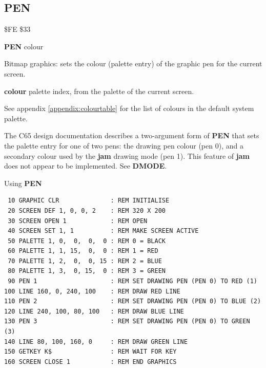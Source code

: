 \subsection{PEN}
\begin{description}[leftmargin=2cm,style=nextline]
\item [Token:]    \$FE \$33

\item [Format:]   {\bf PEN} colour

\item [Usage:]    Bitmap graphics: sets the colour (palette entry) of the graphic pen for the current screen.

                  {\bf colour} palette index, from the palette of the current screen.

                  See appendix \vref{appendix:colourtable} for the list of colours in the default system palette.

\item [Remarks:]  The C65 design documentation describes a two-argument form of {\bf PEN} that sets the palette entry for one of two pens: the drawing pen colour (pen 0), and a secondary colour used by the {\bf jam} drawing mode (pen 1). This feature of {\bf jam} does not appear to be implemented. See {\bf DMODE}.

\item [Example:]  Using {\bf PEN}

\begin{tcolorbox}[colback=black,coltext=white]
\verbatimfont{\codefont}
\begin{verbatim}
 10 GRAPHIC CLR              : REM INITIALISE
 20 SCREEN DEF 1, 0, 0, 2    : REM 320 X 200
 30 SCREEN OPEN 1            : REM OPEN
 40 SCREEN SET 1, 1          : REM MAKE SCREEN ACTIVE
 50 PALETTE 1, 0,  0,  0,  0 : REM 0 = BLACK
 60 PALETTE 1, 1, 15,  0,  0 : REM 1 = RED
 70 PALETTE 1, 2,  0,  0, 15 : REM 2 = BLUE
 80 PALETTE 1, 3,  0, 15,  0 : REM 3 = GREEN
 90 PEN 1                    : REM SET DRAWING PEN (PEN 0) TO RED (1)
100 LINE 160, 0, 240, 100    : REM DRAW RED LINE
110 PEN 2                    : REM SET DRAWING PEN (PEN 0) TO BLUE (2)
120 LINE 240, 100, 80, 100   : REM DRAW BLUE LINE
130 PEN 3                    : REM SET DRAWING PEN (PEN 0) TO GREEN (3)
140 LINE 80, 100, 160, 0     : REM DRAW GREEN LINE
150 GETKEY K$                : REM WAIT FOR KEY
160 SCREEN CLOSE 1           : REM END GRAPHICS
\end{verbatim}
\end{tcolorbox}
\end{description}

